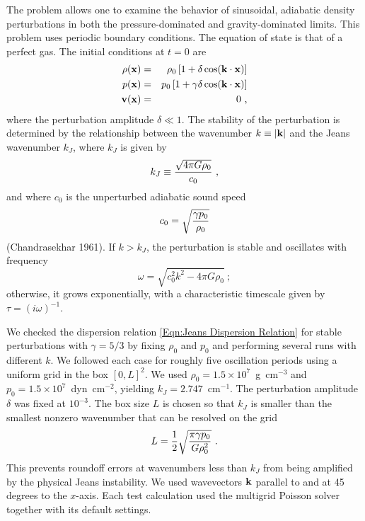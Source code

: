 The  problem allows one to examine the behavior of sinusoidal,
adiabatic
density perturbations in both the pressure-dominated and gravity-dominated
limits. This problem uses periodic boundary conditions.
The equation of state is that of a perfect gas.
The initial conditions at $t=0$ are
\begin{eqnarray}
\nonumber
\rho({\bf x}) & = & \rho_0\left[ 1 +
                    \delta\,{\rm cos}({\bf k}\cdot{\bf x})\right] \\
\label{Eqn:Jeans Initial Conditions}
p({\bf x})    & = & p_0\left[ 1 +
                    \gamma\delta\,{\rm cos}({\bf k}\cdot{\bf x})\right] \\
\nonumber
{\bf v}({\bf x})  & = & 0\ ,
\end{eqnarray}
where the perturbation amplitude $\delta\ll 1$.
The stability of the perturbation is determined by the
relationship between the wavenumber $k\equiv |{\bf k}|$
and the Jeans wavenumber $k_J$, where $k_J$ is given by
\begin{equation}
k_J \equiv {\sqrt{4\pi G\rho_0}\over c_0}\ ,
\end{equation}
and where $c_0$ is the unperturbed adiabatic sound speed
\begin{equation}
c_0 = \sqrt{\gamma p_0\over\rho_0}
\end{equation}
(Chandrasekhar 1961).
If $k > k_J$, the perturbation is stable and oscillates with
frequency
\begin{equation}
\omega = \sqrt{c_0^2k^2 - 4\pi G\rho_0}\ ;
\label{Eqn:Jeans Dispersion Relation}
\end{equation}
otherwise, it grows exponentially, with a characteristic timescale
given by $\tau = (i\omega)^{-1}$.

We checked the dispersion relation \eqref{Eqn:Jeans Dispersion
Relation} for stable perturbations with $\gamma=5/3$ by fixing
$\rho_0$ and $p_0$ and performing several runs with different $k$.
We followed each case for roughly five oscillation periods using a
uniform grid in the box $[0,L]^2$. We used $\rho_0 =
1.5\times10^7$~g~cm$^{-3}$ and $p_0 = 1.5\times10^7$~dyn~cm$^{-2}$,
yielding $k_J = 2.747$~cm$^{-1}$. The perturbation amplitude
$\delta$ was fixed at $10^{-3}$. The box size $L$ is chosen so that
$k_J$ is smaller than the smallest nonzero wavenumber that can be
resolved on the grid
\begin{equation}
L = {1\over 2}\sqrt{\pi\gamma p_0\over G\rho_0^2}\ .
\end{equation}
This prevents roundoff errors
at wavenumbers less than $k_J$ from being amplified by the physical Jeans
instability.
We used wavevectors ${\bf k}$ parallel to and at 45 degrees to the $x$-axis.
Each test calculation used the multigrid Poisson solver together with its
default settings.

